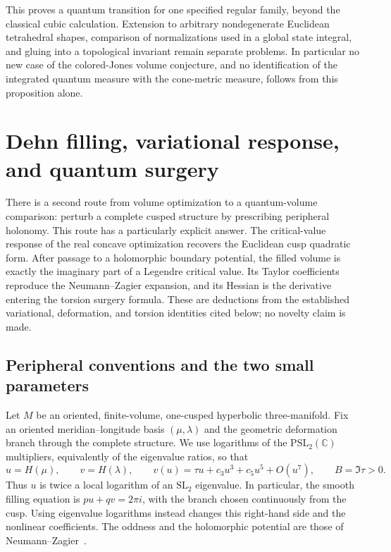 \documentclass[11pt,a4paper]{article}
\numberwithin{equation}{section}
\theoremstyle{definition}
\theoremstyle{remark}
\newcommand{\CC}{\mathbb C}
\begin{document}
This proves a quantum transition for one specified regular
family, beyond the classical cubic calculation. Extension
to arbitrary nondegenerate Euclidean tetrahedral shapes,
comparison of normalizations used in a global state integral,
and gluing into a topological invariant remain separate
problems. In particular no new case of the colored-Jones
volume conjecture, and no identification of the integrated
quantum measure with the cone-metric measure, follows from
this proposition alone.

\section{Dehn filling, variational response, and quantum surgery}
\label{sec:dehnresponse}

There is a second route from volume optimization to a quantum-volume
comparison: perturb a complete cusped structure by prescribing peripheral
holonomy. This route has a particularly explicit answer. The critical-value
response of the real concave optimization recovers the Euclidean cusp
quadratic form. After passage to a holomorphic boundary potential, the
filled volume is exactly the imaginary part of a Legendre critical value.
Its Taylor coefficients reproduce the Neumann--Zagier expansion, and its
Hessian is the derivative entering the torsion surgery formula.
These are deductions from the established variational, deformation, and
torsion identities cited below; no novelty claim is made.

\subsection{Peripheral conventions and the two small parameters}

Let $M$ be an oriented, finite-volume, one-cusped hyperbolic
three-manifold. Fix an oriented meridian--longitude basis $(\mu,\lambda)$
and the geometric deformation branch through the complete structure.
We use logarithms of the $\mathrm{PSL}_2(\CC)$ multipliers, equivalently
of the eigenvalue ratios, so that
\begin{equation}
 u=H(\mu),\qquad v=H(\lambda),\qquad
 v(u)=\tau u+c_3u^3+c_5u^5+O(u^7),\qquad
 B=\Im\tau>0.
 \label{eq:dehnholonomy}
\end{equation}
Thus $u$ is twice a local logarithm of an $\mathrm{SL}_2$ eigenvalue.
In particular, the smooth filling equation is $pu+qv=2\pi i$,
with the branch chosen continuously from the cusp. Using eigenvalue
logarithms instead changes this right-hand side and the nonlinear
coefficients. The oddness and the holomorphic potential are those of
Neumann--Zagier~\cite[Sections 4--6]{NeumannZagier}.
\end{document}

